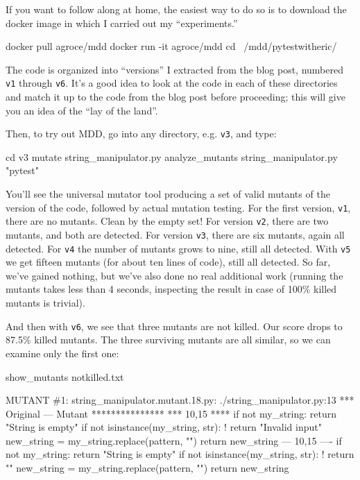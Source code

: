 \documentclass[sigplan,screen]{acmart}
\begin{document}
    If you want to follow along at home, the easiest way to do so is
    to download the docker image in which I carried out my
    ``experiments.''

 \begin{code}
 docker pull agroce/mdd
 docker run -it agroce/mdd
 cd ~/mdd/pytestwitheric/
 \end{code}

The code is organized into ``versions'' I extracted from the blog
post, numbered {\tt v1} through {\tt v6}.  It's a good idea to look at
the code in each of these directories and match it up to the code from
the blog post before proceeding; this will give you an idea of the
``lay of the land''.
 
    Then, to try out MDD, go into any directory, e.g. {\tt v3}, and type:

 \begin{code}
 cd v3
 mutate string\_manipulator.py
 analyze\_mutants string\_manipulator.py "pytest"
\end{code}

You'll see the universal mutator tool producing a set of valid mutants
of the version of the code, followed by actual mutation testing.  For
the first version, {\tt v1}, there are no mutants.  Clean by the
empty set!  For version {\tt v2}, there are two mutants, and both are
detected.  For version {\tt v3}, there are six mutants, again all
detected. For {\tt v4} the number of mutants grows to nine, still all
detected.  With {\tt v5} we get fifteen mutants (for about ten lines
of code), still all detected.  So far, we've gained nothing, but we've
also done no real additional work (running the mutants takes less than 4
seconds, inspecting the result in case of 100\% killed mutants is trivial).

And then with {\tt v6}, we see that three mutants are not killed. Our
score drops to 87.5\% killed mutants.  The three surviving mutants are
all similar, so we can examine only the first one:

{\scriptsize
\begin{code}
show\_mutants notkilled.txt 

MUTANT \#1:
string\_manipulator.mutant.18.py: ./string\_manipulator.py:13
*** Original
--- Mutant
***************
*** 10,15 ****
          if not my\_string:  
              return "String is empty"  
          if not isinstance(my\_string, str):  
!             return "Invalid input"  
          new\_string = my\_string.replace(pattern, "")  
          return new\_string
--- 10,15 ----
          if not my\_string:  
              return "String is empty"  
          if not isinstance(my\_string, str):  
!             return ""  
          new\_string = my\_string.replace(pattern, "")  
          return new\_string
        \end{code}
      }
\end{document}
